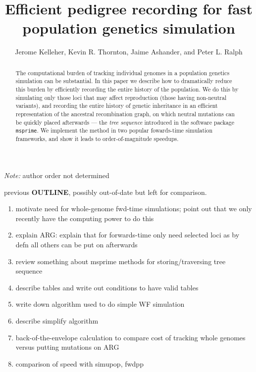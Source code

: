 \documentclass{article}
\newcommand{\msprime}{\texttt{msprime}}
\begin{document}
\title{Efficient pedigree recording for fast population genetics simulation}
\author{Jerome Kelleher,
        Kevin R. Thornton,
        Jaime Ashander, and
        Peter L. Ralph}
\maketitle

\emph{Note:} author order not determined


\begin{abstract}
    The computational burden of tracking individual genomes
    in a population genetics simulation can be substantial.
    In this paper we describe how to dramatically reduce this burden by
    efficiently recording the entire history of the population.
    We do this by simulating only those loci that may affect reproduction (those having non-neutral variants),
    and recording the entire history of genetic inheritance in an efficient representation of the ancestral recombination graph,
    on which neutral mutations can be quickly placed afterwards ---
    the \emph{tree sequence} introduced in the software package \msprime.
    We implement the method in two popular fowards-time simulation frameworks,
    and show it leads to order-of-magnitude speedups.
\end{abstract}


previous \textbf{OUTLINE}, possibly out-of-date but left for comparison.
\begin{enumerate}
    \item motivate need for whole-genome fwd-time simulations; point out that we only recently have the computing power to do this
    \item explain ARG: explain that for forwards-time only need selected loci as by defn all others can be put on afterwards
    \item review something about msprime methods for storing/traversing tree sequence
    \item describe tables and write out conditions to have valid tables
    \item write down algorithm used to do simple WF simulation
    \item describe simplify algorithm
    \item back-of-the-envelope calculation to compare cost of tracking whole genomes versus putting mutations on ARG
    \item comparison of speed with simupop, fwdpp
\end{enumerate}
\end{document}
